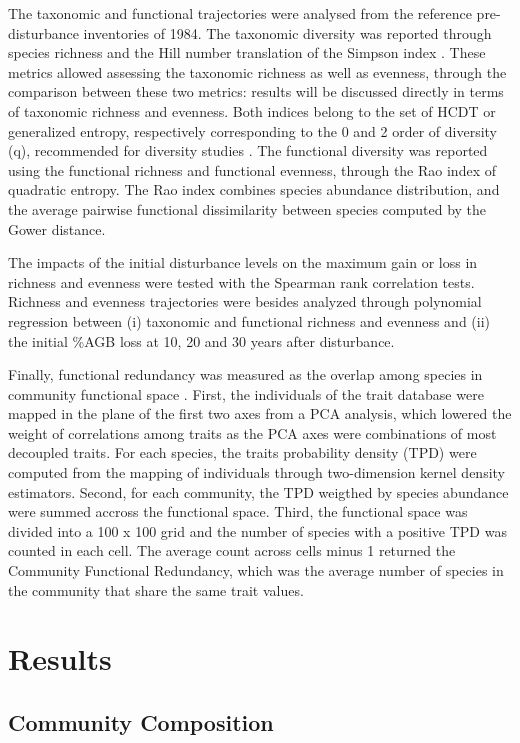 \documentclass[fleqn,10pt]{ArtEcoFoG} %
\begin{document}
The taxonomic and functional trajectories were analysed from the
reference pre-disturbance inventories of 1984. The taxonomic diversity
was reported through species richness and the Hill number translation of
the Simpson index \citep{Hill1973}. These metrics allowed assessing the
taxonomic richness as well as evenness, through the comparison between
these two metrics: results will be discussed directly in terms of
taxonomic richness and evenness. Both indices belong to the set of HCDT
or generalized entropy, respectively corresponding to the 0 and 2 order
of diversity (q), recommended for diversity studies \citep{Marcon2015}.
The functional diversity was reported using the functional richness and
functional evenness, through the Rao index of quadratic entropy. The Rao
index combines species abundance distribution, and the average pairwise
functional dissimilarity between species computed by the Gower distance.

The impacts of the initial disturbance levels on the maximum gain or
loss in richness and evenness were tested with the Spearman rank
correlation tests. Richness and evenness trajectories were besides
analyzed through polynomial regression between (i) taxonomic and
functional richness and evenness and (ii) the initial \%AGB loss at 10,
20 and 30 years after disturbance.

Finally, functional redundancy was measured as the overlap among species
in community functional space \citep{Carmona2016}. First, the
individuals of the trait database were mapped in the plane of the first
two axes from a PCA analysis, which lowered the weight of correlations
among traits as the PCA axes were combinations of most decoupled traits.
For each species, the traits probability density (TPD) were computed
from the mapping of individuals through two-dimension kernel density
estimators. Second, for each community, the TPD weigthed by species
abundance were summed accross the functional space. Third, the
functional space was divided into a 100 x 100 grid and the number of
species with a positive TPD was counted in each cell. The average count
across cells minus 1 returned the Community Functional Redundancy, which
was the average number of species in the community that share the same
trait values.

\section{Results}\label{results}

\subsection{Community Composition}\label{community-composition}
\end{document}
